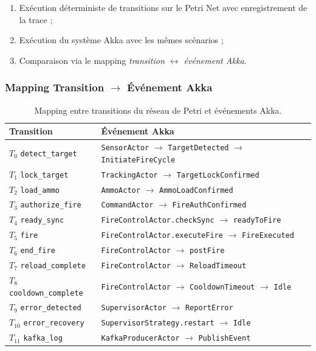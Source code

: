 \documentclass[11pt,a4paper]{article}
\newcommand{\code}[1]{\texttt{#1}}
\begin{document}
\begin{enumerate}[leftmargin=1.2cm,itemsep=2pt]
  \item Exécution déterministe de transitions sur le Petri Net avec
        enregistrement de la trace ;
  \item Exécution du système Akka avec les mêmes scénarios ;
  \item Comparaison via le mapping \emph{transition $\leftrightarrow$
        événement Akka}.
\end{enumerate}

\subsubsection{Mapping Transition $\to$ Événement Akka}

\begin{table}[H]
\centering\small
\begin{tabularx}{\linewidth}{l X}
\toprule
\rowcolor{tableheader}\textbf{Transition} & \textbf{Événement Akka} \\
\midrule
$T_0$ \code{detect\_target}     & \code{SensorActor} $\to$ \code{TargetDetected} $\to$ \code{InitiateFireCycle} \\
$T_1$ \code{lock\_target}       & \code{TrackingActor} $\to$ \code{TargetLockConfirmed} \\
$T_2$ \code{load\_ammo}         & \code{AmmoActor} $\to$ \code{AmmoLoadConfirmed} \\
$T_3$ \code{authorize\_fire}    & \code{CommandActor} $\to$ \code{FireAuthConfirmed} \\
$T_4$ \code{ready\_sync}        & \code{FireControlActor.checkSync} $\to$ \code{readyToFire} \\
$T_5$ \code{fire}               & \code{FireControlActor.executeFire} $\to$ \code{FireExecuted} \\
$T_6$ \code{end\_fire}          & \code{FireControlActor} $\to$ \code{postFire} \\
$T_7$ \code{reload\_complete}   & \code{FireControlActor} $\to$ \code{ReloadTimeout} \\
$T_8$ \code{cooldown\_complete} & \code{FireControlActor} $\to$ \code{CooldownTimeout} $\to$ \code{Idle} \\
$T_9$ \code{error\_detected}    & \code{SupervisorActor} $\to$ \code{ReportError} \\
$T_{10}$ \code{error\_recovery} & \code{SupervisorStrategy.restart} $\to$ \code{Idle} \\
$T_{11}$ \code{kafka\_log}      & \code{KafkaProducerActor} $\to$ \code{PublishEvent} \\
\bottomrule
\end{tabularx}
\caption{Mapping entre transitions du réseau de Petri et événements Akka.}
\end{table}
\end{document}
